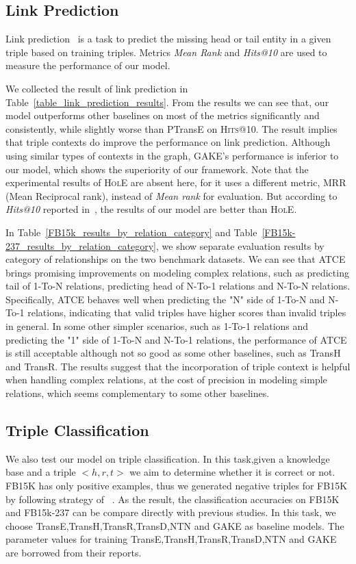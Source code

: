 \subsection{Link Prediction}
Link prediction~\cite{BordesUGWY13} is a task to predict the missing head or tail entity in a given triple based on training triples. Metrics \textit{Mean Rank} and \textit{Hits@10} are used to measure the performance of our model.


We collected the result of link prediction in Table~\ref{table_link_prediction_results}. From the results we can see that, our model outperforms other baselines on most of the metrics significantly and consistently, while slightly worse than PTransE on \textsc{Hits}@10. The result implies that triple contexts do improve the performance on link prediction. Although using similar types of contexts in the graph, GAKE's performance is inferior to our model, which shows the superiority of our framework. Note that the experimental results of \textsc{HolE} are absent here, for it uses a different metric, MRR (Mean Reciprocal rank), instead of \textit{Mean rank} for evaluation. But according to \textit{Hits@10} reported in~\cite{NickelRP16}, the results of our model are better than \textsc{HolE}.


In Table~\ref{FB15k_results_by_relation_category} and Table~\ref{FB15k-237_results_by_relation_category}, we show separate evaluation results by category of relationships on the two benchmark datasets. We can see that ATCE brings promising improvements on modeling complex relations, such as predicting tail of 1-To-N relations, predicting head of N-To-1 relations and N-To-N relations. Specifically, ATCE behaves well when predicting the "N" side of 1-To-N and N-To-1 relations, indicating that valid triples have higher scores than invalid triples in general. In some other simpler scenarios, such as 1-To-1 relations and predicting the "1" side of 1-To-N and N-To-1 relations, the performance of ATCE is still acceptable although not so good as some other baselines, such as TransH and TransR. The results suggest that the incorporation of triple context is helpful when handling complex relations, at the cost of precision in modeling simple relations, which seems complementary to some other baselines.
\subsection{Triple Classification}
We also test our model on triple classification. In this task,given a knowledge base and a triple $<h,r,t>$ we aim to determine whether it is correct or not. FB15K has only positive examples, thus we generated negative triples for FB15K by following strategy of ~\cite{socher2013}. As the result, the classification accuracies on FB15K and FB15k-237 can be compare directly with previous studies. In this task, we choose TransE,TransH,TransR,TransD,NTN and GAKE as baseline models. The parameter values for training TransE,TransH,TransR,TransD,NTN and GAKE are borrowed from their reports.

